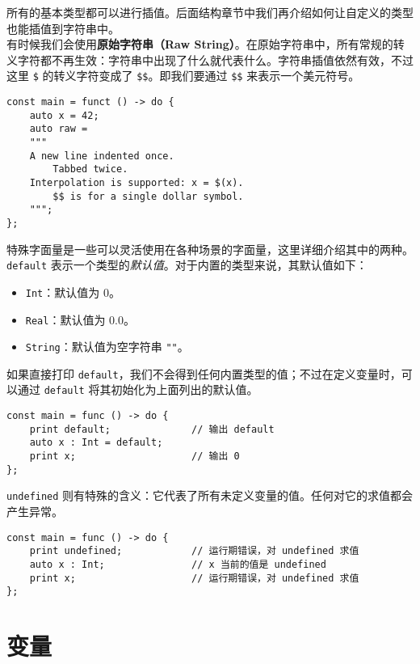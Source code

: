 所有的基本类型都可以进行插值。后面结构章节中我们再介绍如何让自定义的类型也能插值到字符串中。 \\

有时候我们会使用\textbf{原始字符串（Raw String）}。在原始字符串中，所有常规的转义字符都不再生效：字符串中出现了什么就代表什么。字符串插值依然有效，不过这里 \texttt{\$} 的转义字符变成了 \texttt{\$\$}。即我们要通过 \texttt{\$\$} 来表示一个美元符号。

\begin{lstlisting}
const main = funct () -> do {
    auto x = 42;
    auto raw = 
    """
    A new line indented once.
        Tabbed twice.
    Interpolation is supported: x = $(x).
        $$ is for a single dollar symbol.
    """;
};
\end{lstlisting}

特殊字面量是一些可以灵活使用在各种场景的字面量，这里详细介绍其中的两种。 \\

\lstinline!default! 表示一个类型的\emph{默认值}。对于内置的类型来说，其默认值如下：

\begin{itemize}
	\item \lstinline!Int!：默认值为 0。
	\item \lstinline!Real!：默认值为 0.0。
	\item \lstinline!String!：默认值为空字符串 \lstinline!""!。
\end{itemize}

如果直接打印 \lstinline!default!，我们不会得到任何内置类型的值；不过在定义变量时，可以通过 \lstinline!default! 将其初始化为上面列出的默认值。

\begin{lstlisting}
const main = func () -> do {
    print default;				// 输出 default
    auto x : Int = default;
    print x;					// 输出 0
};
\end{lstlisting}

\lstinline!undefined! 则有特殊的含义：它代表了所有未定义变量的值。任何对它的求值都会产生异常。

\begin{lstlisting}
const main = func () -> do {
	print undefined;			// 运行期错误，对 undefined 求值
	auto x : Int;				// x 当前的值是 undefined
	print x;					// 运行期错误，对 undefined 求值
};
\end{lstlisting}

\section{变量}

